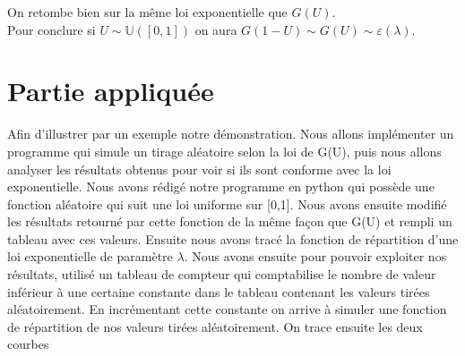 \documentclass[12,french]{report}
\begin{document}
On retombe bien sur la même loi exponentielle que $G(U)$. \\

Pour conclure si $U\sim\mathbb{U}([0,1])$ on aura $G(1-U) \sim G(U)\sim \varepsilon(\lambda)$.

\chapter{Partie appliquée}

Afin d'illustrer par un exemple notre démonstration. Nous allons implémenter un programme qui simule un tirage aléatoire selon la loi de G(U), puis nous allons analyser les résultats obtenus pour voir si ils sont conforme avec la loi exponentielle. Nous avons rédigé notre programme en python qui possède une fonction aléatoire qui suit une loi uniforme sur [0,1]. Nous avons ensuite modifié les résultats retourné par cette fonction de la même façon que G(U) et rempli un tableau avec ces valeurs. Ensuite nous avons tracé la fonction de répartition d'une loi exponentielle de paramètre $\lambda$. Nous avons ensuite pour pouvoir exploiter nos résultats, utilisé un tableau de compteur qui comptabilise le nombre de valeur inférieur à une certaine constante dans le tableau contenant les valeurs tirées aléatoirement. En incrémentant cette constante on arrive à simuler une fonction de répartition de nos valeurs tirées aléatoirement. On trace ensuite les deux courbes
\end{document}
